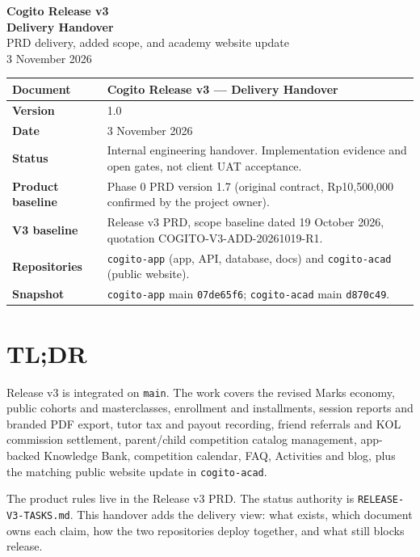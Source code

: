 \documentclass[11pt,a4paper]{article}
\newcommand{\code}[1]{\texttt{#1}}
\begin{document}
\begin{center}
{\LARGE\textbf{Cogito Release v3}}\\[4pt]
{\Large\textbf{Delivery Handover}}\\[5pt]
{\normalsize PRD delivery, added scope, and academy website update}\\[4pt]
{\normalsize 3 November 2026}
\end{center}
\vspace{1em}

\begin{tabular}{@{}L{3.2cm}L{12.3cm}@{}}
\toprule
\textbf{Document} & Cogito Release v3 --- Delivery Handover \\
\midrule
\textbf{Version} & 1.0 \\
\textbf{Date} & 3 November 2026 \\
\textbf{Status} & Internal engineering handover. Implementation evidence and open gates, not client UAT acceptance. \\
\textbf{Product baseline} & Phase 0 PRD version 1.7 (original contract, Rp10,500,000 confirmed by the project owner). \\
\textbf{V3 baseline} & Release v3 PRD, scope baseline dated 19 October 2026, quotation COGITO-V3-ADD-20261019-R1. \\
\textbf{Repositories} & \code{cogito-app} (app, API, database, docs) and \code{cogito-acad} (public website). \\
\textbf{Snapshot} & \code{cogito-app} main \code{07de65f6}; \code{cogito-acad} main \code{d870c49}. \\
\bottomrule
\end{tabular}

\vspace{0.5em}

\section*{TL;DR}
Release v3 is integrated on \code{main}. The work covers the revised Marks economy, public cohorts and masterclasses, enrollment and installments, session reports and branded PDF export, tutor tax and payout recording, friend referrals and KOL commission settlement, parent/child competition catalog management, app-backed Knowledge Bank, competition calendar, FAQ, Activities and blog, plus the matching public website update in \code{cogito-acad}.

The product rules live in the Release v3 PRD. The status authority is \code{RELEASE-V3-TASKS.md}. This handover adds the delivery view: what exists, which document owns each claim, how the two repositories deploy together, and what still blocks release.
\end{document}
